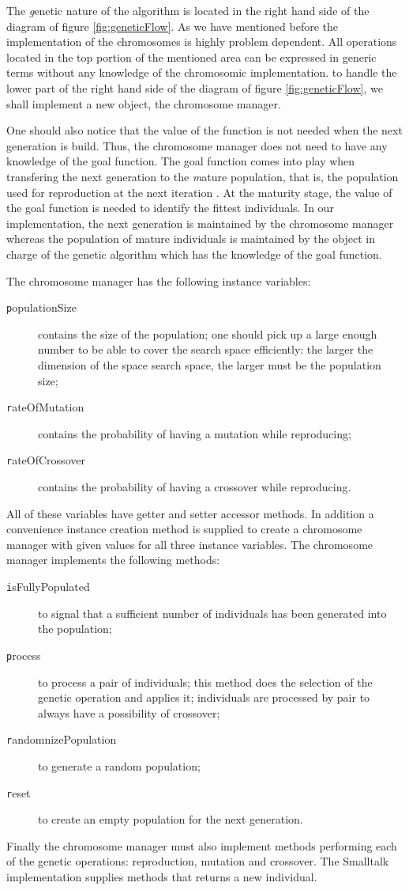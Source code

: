 The {\textsl genetic} nature of the algorithm is located in the right
hand side of the diagram of figure \ref{fig:geneticFlow}. As we
have mentioned before the implementation of the chromosomes is
highly problem dependent. All operations located in the top
portion of the mentioned area can be expressed in generic terms
without any knowledge of the chromosomic implementation. to handle
the lower part of the right hand side of the diagram of figure
\ref{fig:geneticFlow}, we shall implement a new object, the
chromosome manager.

One should also notice that the value of the function is not
needed when the next generation is build. Thus, the chromosome
manager does not need to have any knowledge of the goal function.
The goal function comes into play when transfering the next
generation to the {\textsl mature} population, that is, the population
used for reproduction at the next iteration . At the maturity
stage, the value of the goal function is needed to identify the
fittest individuals. In our implementation, the next generation is
maintained by the chromosome manager whereas the population of
mature individuals is maintained by the object in charge of the
genetic algorithm which has the knowledge of the goal function.

\noindent The chromosome manager has the following instance
variables:
\begin{description}
  \item[\texttt populationSize] contains the size of the population;
  one should pick up a large enough number to be able to cover the
  search space efficiently: the larger the dimension of the space
  search space, the larger must be the population size;
  \item[\texttt rateOfMutation] contains the probability of having a
  mutation while reproducing;
  \item[\texttt rateOfCrossover] contains the probability of having a
  crossover while reproducing.
\end{description}
All of these variables have getter and setter accessor methods. In
addition a convenience instance creation method is supplied to
create a chromosome manager with given values for all three
instance variables. The chromosome manager implements the
following methods:
\begin{description}
  \item[\texttt isFullyPopulated] to signal that a sufficient number of individuals
  has been generated into the population;
  \item[\texttt process] to process a pair of individuals; this method
  does the selection of the genetic operation and applies it;
  individuals are processed by pair to always have a possibility
  of crossover;
  \item[\texttt randomnizePopulation] to generate a random population;
  \item[\texttt reset] to create an empty population for the next
  generation.
\end{description}
Finally the chromosome manager must also implement methods
performing each of the genetic operations: reproduction, mutation
and crossover. The Smalltalk implementation supplies methods that
returns a new individual.

